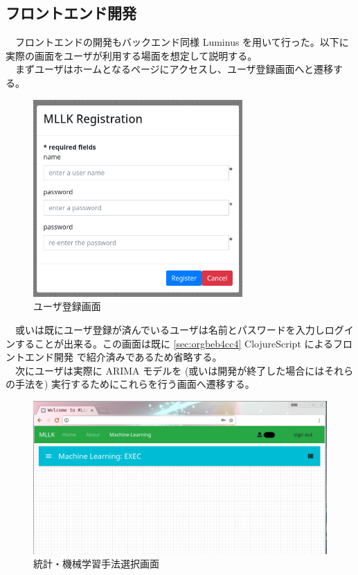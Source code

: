 \documentclass{scrartcl}
\begin{document}
\subsection{フロントエンド開発}
\label{sec:org15385dc}
　フロントエンドの開発もバックエンド同様 Luminus を用いて行った。以下に実際の画面をユーザが利用する場面を想定して説明する。\\
　まずユーザはホームとなるページにアクセスし、ユーザ登録画面へと遷移する。\\
\begin{figure}[htbp]
\centering
\includegraphics[width=8cm]{./register.PNG}
\caption{ユーザ登録画面}
\end{figure}

　或いは既にユーザ登録が済んでいるユーザは名前とパスワードを入力しログインすることが出来る。この画面は既に \ref{sec:orgbeb4cc4} ClojureScript によるフロントエンド開発 で紹介済みであるため省略する。\\
　次にユーザは実際に ARIMA モデルを (或いは開発が終了した場合にはそれらの手法を) 実行するためにこれらを行う画面へ遷移する。\\
\begin{figure}[htbp]
\centering
\includegraphics[width=12cm]{./ml-view.PNG}
\caption{統計・機械学習手法選択画面}
\end{figure}
\end{document}
